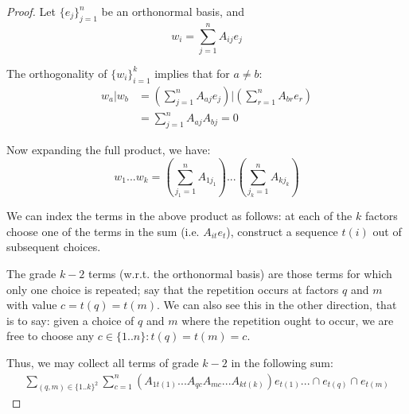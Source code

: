 \begin{proof}
	Let $\{e_j\}_{j=1}^n$ be an orthonormal basis, and
	\[w_i = \sum_{j=1}^n A_{ij} e_j\]

	The orthogonality of $\{w_i\}_{i=1}^k$ implies that for $a \neq b$:
	\begin{align*}
		w_a|w_b &= (\sum_{j=1}^n A_{aj} e_j)|(\sum_{r=1}^n A_{br} e_r) \\
				&= \sum_{j=1}^n A_{aj}A_{bj} = 0
	\end{align*}

	Now expanding the full product, we have:
	\[w_1...w_k = (\sum_{j_1=1}^n A_{1{j_1}})...(\sum_{j_k=1}^n A_{k{j_k}})\]

	We can index the terms in the above product as follows: at each of the $k$ factors choose one of the terms in the sum (i.e. $A_{it} e_t$), construct a sequence $t(i)$ out of subsequent choices.

	The grade $k-2$ terms (w.r.t. the orthonormal basis) are those terms for which only one choice is repeated; say that the repetition occurs at factors $q$ and $m$ with value $c = t(q) = t(m)$. We can also see this in the other direction, that is to say: given a choice of $q$ and $m$ where the repetition ought to occur, we are free to choose any $c \in \{1..n\}: t(q) = t(m) = c$.

	Thus, we may collect all terms of grade $k-2$ in the following sum:
	\begin{align*}
		\sum_{(q,m) \in \{1..k\}^2} \sum_{c=1}^n (A_{1t(1)}...A_{qc}A_{mc}...A_{kt(k)})e_{t(1)}...\cap{e_{t(q)}}\cap{e_{t(m)}}
	\end{align*}
\end{proof}
